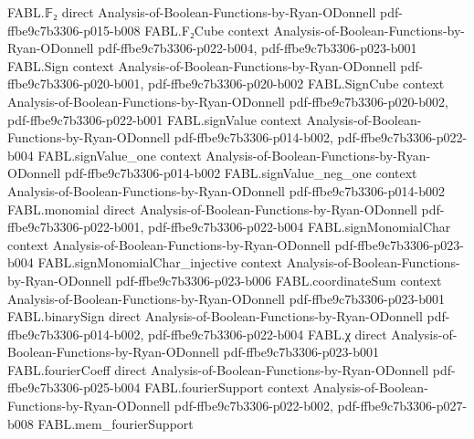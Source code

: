 \begin{theorem}
\label{FABL.padThreeCNF_clause_width_eq_three}
\leanok
{}
\proofstep
  {FABL.𝔽₂}
  {direct}
  {Analysis-of-Boolean-Functions-by-Ryan-ODonnell}
  {pdf-ffbe9c7b3306-p015-b008}
\proofstep
  {FABL.F₂Cube}
  {context}
  {Analysis-of-Boolean-Functions-by-Ryan-ODonnell}
  {pdf-ffbe9c7b3306-p022-b004,
    pdf-ffbe9c7b3306-p023-b001}
\proofstep
  {FABL.Sign}
  {context}
  {Analysis-of-Boolean-Functions-by-Ryan-ODonnell}
  {pdf-ffbe9c7b3306-p020-b001,
    pdf-ffbe9c7b3306-p020-b002}
\proofstep
  {FABL.SignCube}
  {context}
  {Analysis-of-Boolean-Functions-by-Ryan-ODonnell}
  {pdf-ffbe9c7b3306-p020-b002,
    pdf-ffbe9c7b3306-p022-b001}
\proofstep
  {FABL.signValue}
  {context}
  {Analysis-of-Boolean-Functions-by-Ryan-ODonnell}
  {pdf-ffbe9c7b3306-p014-b002,
    pdf-ffbe9c7b3306-p022-b004}
\proofstep
  {FABL.signValue_one}
  {context}
  {Analysis-of-Boolean-Functions-by-Ryan-ODonnell}
  {pdf-ffbe9c7b3306-p014-b002}
\proofstep
  {FABL.signValue_neg_one}
  {context}
  {Analysis-of-Boolean-Functions-by-Ryan-ODonnell}
  {pdf-ffbe9c7b3306-p014-b002}
\proofstep
  {FABL.monomial}
  {direct}
  {Analysis-of-Boolean-Functions-by-Ryan-ODonnell}
  {pdf-ffbe9c7b3306-p022-b001,
    pdf-ffbe9c7b3306-p022-b004}
\proofstep
  {FABL.signMonomialChar}
  {context}
  {Analysis-of-Boolean-Functions-by-Ryan-ODonnell}
  {pdf-ffbe9c7b3306-p023-b004}
\proofstep
  {FABL.signMonomialChar_injective}
  {context}
  {Analysis-of-Boolean-Functions-by-Ryan-ODonnell}
  {pdf-ffbe9c7b3306-p023-b006}
\proofstep
  {FABL.coordinateSum}
  {context}
  {Analysis-of-Boolean-Functions-by-Ryan-ODonnell}
  {pdf-ffbe9c7b3306-p023-b001}
\proofstep
  {FABL.binarySign}
  {direct}
  {Analysis-of-Boolean-Functions-by-Ryan-ODonnell}
  {pdf-ffbe9c7b3306-p014-b002,
    pdf-ffbe9c7b3306-p022-b004}
\proofstep
  {FABL.χ}
  {direct}
  {Analysis-of-Boolean-Functions-by-Ryan-ODonnell}
  {pdf-ffbe9c7b3306-p023-b001}
\proofstep
  {FABL.fourierCoeff}
  {direct}
  {Analysis-of-Boolean-Functions-by-Ryan-ODonnell}
  {pdf-ffbe9c7b3306-p025-b004}
\proofstep
  {FABL.fourierSupport}
  {context}
  {Analysis-of-Boolean-Functions-by-Ryan-ODonnell}
  {pdf-ffbe9c7b3306-p022-b002,
    pdf-ffbe9c7b3306-p027-b008}
\proofstep
  {FABL.mem_fourierSupport}

\end{theorem}
